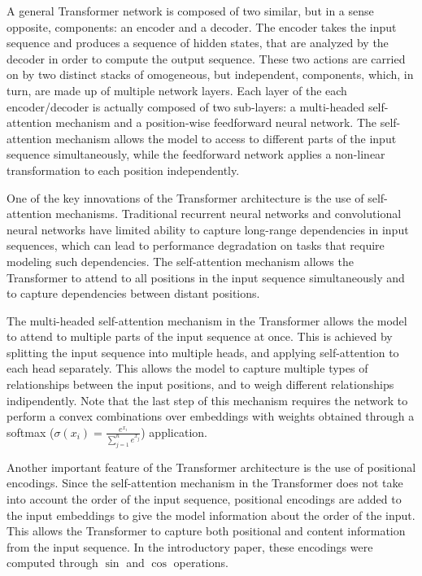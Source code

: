 \documentclass{article}
\begin{document}
A general Transformer network is composed of two similar, but in a sense opposite, components: an encoder and a decoder. The encoder takes the input sequence and produces a sequence of hidden states, that are analyzed by the decoder in order to compute the output sequence. These two actions are carried on by two distinct stacks of omogeneous, but independent, components, which, in turn, are made up of multiple network layers. Each layer of the each encoder/decoder is actually composed of two sub-layers: a multi-headed self-attention mechanism and a position-wise feedforward neural network. The self-attention mechanism allows the model to access to different parts of the input sequence simultaneously, while the feedforward network applies a non-linear transformation to each position independently.

One of the key innovations of the Transformer architecture is the use of self-attention mechanisms. Traditional recurrent neural networks and convolutional neural networks have limited ability to capture long-range dependencies in input sequences, which can lead to performance degradation on tasks that require modeling such dependencies. The self-attention mechanism allows the Transformer to attend to all positions in the input sequence simultaneously and to capture dependencies between distant positions.

The multi-headed self-attention mechanism in the Transformer allows the model to attend to multiple parts of the input sequence at once. This is achieved by splitting the input sequence into multiple heads, and applying self-attention to each head separately. This allows the model to capture multiple types of relationships between the input positions, and to weigh different relationships indipendently. Note that the last step of this mechanism requires the network to perform a convex combinations over embeddings with weights obtained through a softmax ($\sigma(x_i) = \frac{e^{x_i}}{\sum_{j=1}^{n} e^{x_j}}$) application.

Another important feature of the Transformer architecture is the use of positional encodings. Since the self-attention mechanism in the Transformer does not take into account the order of the input sequence, positional encodings are added to the input embeddings to give the model information about the order of the input. This allows the Transformer to capture both positional and content information from the input sequence. In the introductory paper, these encodings were computed through $\sin$ and $\cos$ operations.
\end{document}
